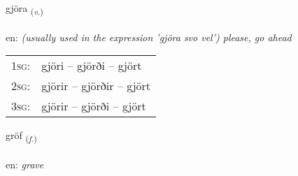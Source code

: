 \documentclass[frontgrid, backgrid]{flacards}\usepackage[]{graphicx}\usepackage[]{xcolor}
\begin{document}
\renewcommand{\flhead}{\vskip5pt \fboxsep=0pt {\small\bfseries\footnotesize Sagnorð | Verb}}
\renewcommand{\fcfoot}{\vskip5pt \fboxsep=0pt \hspace{2pt}{\small\bfseries\footnotesize 3K}}

\renewcommand{\blhead}{\vskip5pt {\small\bfseries\footnotesize Sagnorð | Verb }}
\renewcommand{\bcfoot}{\vskip5pt \hspace{2pt}{\small\bfseries\footnotesize 3K}}


{gjöra \small{\textsubscript{(\textit{v.})}} \\[1ex] %
\textphonetic{[cœːra]} \\
en: \emph{(usually used in the expression 'gjöra svo vel') please, go ahead} \\  [2ex]
\renewcommand*{\arraystretch}{0.8}
\begin{tabular}{p{1cm}l}
\textsc{1sg}: & gjöri -- gjörði -- gjört \\ 
\textsc{2sg}: & gjörir -- gjörðir -- gjört \\ 
\textsc{3sg}: & gjörir -- gjörði -- gjört \\ 
\end{tabular}
}

\renewcommand{\flhead}{\vskip5pt \fboxsep=0pt {\small\bfseries\footnotesize Nafnorð | Noun}}
\renewcommand{\fcfoot}{\vskip5pt \fboxsep=0pt \hspace{2pt}{\small\bfseries\footnotesize 3K}}

\renewcommand{\blhead}{\vskip5pt {\small\bfseries\footnotesize Nafnorð | Noun }}
\renewcommand{\bcfoot}{\vskip5pt \hspace{2pt}{\small\bfseries\footnotesize 3K}}


{gröf \small{\textsubscript{(\textit{f.})}} \\[1ex] %
\textphonetic{[krœːf]} \\
en: \emph{grave} \\  [2ex]
\renewcommand*{\arraystretch}{0.8}
}
\end{document}
